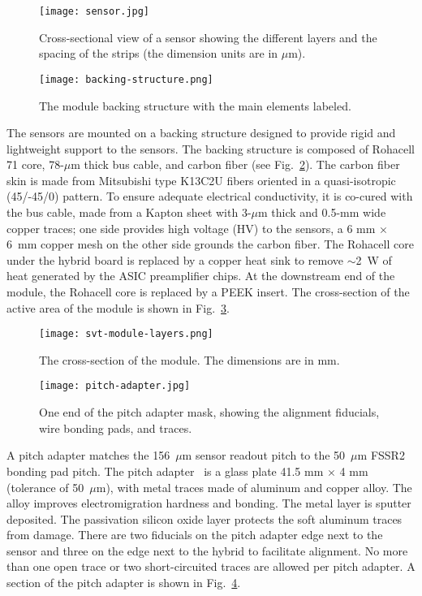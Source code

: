 \begin{figure}[h] 
\centering 
\texttt{[image: sensor.jpg]}
\caption{Cross-sectional view of a sensor showing the different layers and the spacing of the strips (the dimension units are in $\mu$m).}
\label{fig:sensor}
\end{figure}

\begin{figure}[h] 
\centering 
\texttt{[image: backing-structure.png]}
\caption{The module backing structure with the main elements labeled.}
\label{fig:backing-structure}
\end{figure}

The sensors are mounted on a backing structure designed to provide rigid and lightweight support to the sensors. The backing structure is composed of Rohacell 71 core, 78-$\mu$m thick bus cable, and carbon fiber (see Fig.~\ref{fig:backing-structure}). The carbon fiber skin is made from Mitsubishi type K13C2U fibers oriented in a quasi-isotropic (45/-45/0) pattern. To ensure adequate electrical conductivity, it is co-cured with the bus cable, made from a Kapton sheet with 3-$\mu$m thick and 0.5-mm wide copper traces; one side provides high voltage (HV) to the sensors, a 6 mm $\times$ 6~mm copper mesh on the other side grounds the carbon fiber.  The Rohacell core under the hybrid board is replaced by a copper heat sink to remove $\sim$2~W of heat generated by the ASIC preamplifier chips. At the downstream end of the module, the Rohacell core is replaced by a PEEK insert. The cross-section of the active area of the module is shown in Fig.~\ref{fig:svt-module-layers}. 

\begin{figure}[h] 
\centering 
\texttt{[image: svt-module-layers.png]}
\caption{The cross-section of the module. The dimensions are in mm.}
\label{fig:svt-module-layers}
\end{figure}

\begin{figure}[hbt] 
\centering 
\texttt{[image: pitch-adapter.jpg]}
\caption{One end of the pitch adapter mask, showing the alignment fiducials, wire bonding pads, and traces.}
\label{fig:pitch-adapter}
\end{figure}

A pitch adapter matches the 156~$\mu$m sensor readout pitch to the 50~$\mu$m FSSR2 bonding pad pitch. The pitch adapter~\cite{PA} is a glass plate 41.5 mm $\times$ 4 mm (tolerance of 50~$\mu$m), with metal traces made of aluminum and copper alloy. The alloy improves electromigration hardness and bonding. The metal layer is sputter deposited. The passivation silicon oxide layer protects the soft aluminum traces from damage. There are two fiducials on the pitch adapter edge next to the sensor and three on the edge next to the hybrid to facilitate alignment. No more than one open trace or two short-circuited traces are allowed per pitch adapter. A section of the pitch adapter is shown in Fig.~\ref{fig:pitch-adapter}. 

